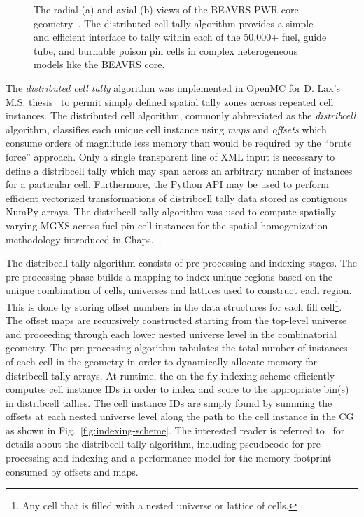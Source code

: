 \begin{figure}[h!]
\begin{subfigure}{0.45\textwidth}
  \caption{}
\end{subfigure}
\caption[Radial and axial views of the BEAVRS core]{The radial (a) and axial (b) views of the BEAVRS \ac{PWR} core geometry~\cite{horelik2013beavrs}. The distributed cell tally algorithm provides a simple and efficient interface to tally within each of the 50,000+ fuel, guide tube, and burnable poison pin cells in complex heterogeneous models like the \ac{BEAVRS} core.}
\label{fig:beavrs}
\end{figure}

The \textit{distributed cell tally} algorithm was implemented in OpenMC for D. Lax's M.S. thesis~\cite{lax2014distribcell} to permit simply defined spatial tally zones across repeated cell instances. The distributed cell algorithm, commonly abbreviated as the \textit{distribcell} algorithm, classifies each unique cell instance using \textit{maps} and \textit{offsets} which consume orders of magnitude less memory than would be required by the ``brute force'' approach. Only a single transparent line of \ac{XML} input is necessary to define a distribcell tally which may span across an arbitrary number of instances for a particular cell. Furthermore, the Python \ac{API} may be used to perform efficient vectorized transformations of distribcell tally data stored as contiguous NumPy arrays. The distribcell tally algorithm was used to compute spatially-varying \ac{MGXS} across fuel pin cell instances for the spatial homogenization methodology introduced in Chaps.~.

The distribcell tally algorithm consists of pre-processing and indexing stages. The pre-processing phase builds a mapping to index unique regions based on the unique combination of cells, universes and lattices used to construct each region. This is done by storing offset numbers in the data structures for each fill cell\footnote{Any cell that is filled with a nested universe or lattice of cells.}. The offset maps are recursively constructed starting from the top-level universe and proceeding through each lower nested universe level in the combinatorial geometry. The pre-processing algorithm tabulates the total number of instances of each cell in the geometry in order to dynamically allocate memory for distribcell tally arrays. At runtime, the on-the-fly indexing scheme efficiently computes cell instance IDs in order to index and score to the appropriate bin(s) in distribcell tallies. The cell instance IDs are simply found by summing the offsets at each nested universe level along the path to the cell instance in the \ac{CG} as shown in Fig.~\ref{fig:indexing-scheme}. The interested reader is referred to~\cite{lax2014distribcell} for details about the distribcell tally algorithm, including pseudocode for pre-processing and indexing and a performance model for the memory footprint consumed by offsets and maps.

